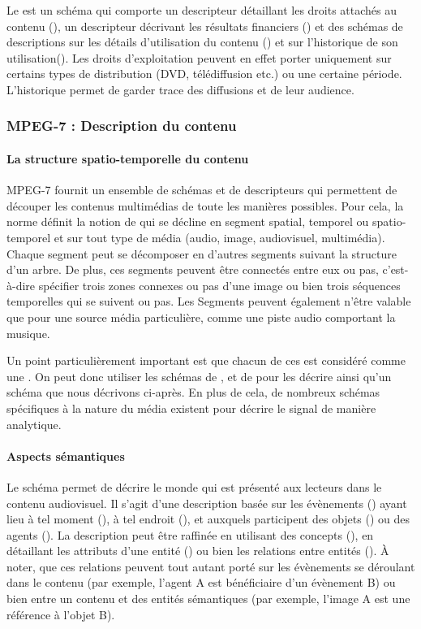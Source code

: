 Le  est un schéma qui comporte un descripteur détaillant les droits attachés au contenu (), un descripteur décrivant les résultats financiers () et des schémas de descriptions sur les détails d'utilisation du contenu () et sur l'historique de son utilisation().
Les droits d'exploitation peuvent en effet porter uniquement sur certains types de distribution (DVD, télédiffusion etc.) ou une certaine période. 
L'historique permet de garder trace des diffusions et de leur audience.


\subsubsection{MPEG-7 : Description du contenu}
\paragraph{La structure spatio-temporelle du contenu}
MPEG-7 fournit un ensemble de schémas et de descripteurs qui permettent de découper les contenus multimédias de toute les manières possibles. 
Pour cela, la norme définit la notion de  qui se décline en segment spatial, temporel ou spatio-temporel et sur tout type de média (audio, image, audiovisuel, multimédia). 
Chaque segment peut se décomposer en d'autres segments suivant la structure d'un arbre. 
De plus, ces segments peuvent être connectés entre eux ou pas, c'est-à-dire spécifier trois zones connexes ou pas d'une image ou bien trois séquences temporelles qui se suivent ou pas. 
Les Segments peuvent également n'être valable que pour une source média particulière, comme une piste audio comportant la musique.

Un point particulièrement important est que chacun de ces  est considéré comme une . 
On peut donc utiliser les schémas de ,  et de  pour les décrire ainsi qu'un schéma  que nous décrivons ci-après. 
En plus de cela, de nombreux schémas spécifiques à la nature du média existent pour décrire le signal de manière analytique. 


\paragraph{Aspects sémantiques}
Le schéma  permet de décrire le monde qui est présenté aux lecteurs dans le contenu audiovisuel. 
Il s'agit d'une description basée sur les évènements () ayant lieu à tel moment (), à tel endroit (), et auxquels participent des objets () ou des agents (). 
La description peut être raffinée en utilisant des concepts (), en détaillant les attributs d'une entité () ou bien les relations entre entités ().
À noter, que ces relations peuvent tout autant porté sur les évènements se déroulant dans le contenu (par exemple, l'agent A est bénéficiaire d'un évènement B) ou bien entre un contenu et des entités sémantiques (par exemple, l'image A est une référence à l'objet B).


